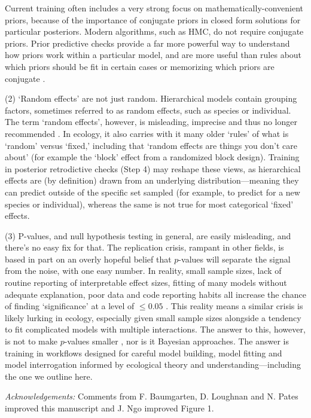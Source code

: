 \documentclass[11pt]{article}
\begin{document}
Current training often includes a very strong focus on mathematically-convenient priors, because of the importance of conjugate priors in closed form solutions for particular posteriors. Modern algorithms, such as HMC, do not require conjugate priors. Prior predictive checks provide a far more powerful way to understand how priors work within a particular model, and are more useful than rules about which priors should be fit in certain cases or memorizing which priors are conjugate \citep{betanprior}. 

(2) `Random effects' are not just random. Hierarchical models contain grouping factors, sometimes referred to as random effects, such as species or individual. The term `random effects', however, is misleading, imprecise and thus no longer recommended \citep{gelmanhill}. In ecology, it also carries with it many older `rules' of what is `random' versus `fixed,' including that `random effects are things you don't care about' (for example the `block' effect from a randomized block design). Training in posterior retrodictive checks (Step 4) may reshape these views, as hierarchical effects are (by definition) drawn from an underlying distribution---meaning they can predict outside of the specific set  sampled (for example, to predict for a new species or individual), whereas the same is not true for most categorical `fixed' effects.


(3) P-values, and null hypothesis testing in general, are easily misleading, and there’s no easy fix for that. The replication crisis, rampant in other fields, is based in part on an overly hopeful belief that $p$-values will separate the signal from the noise, with one easy number. In reality, small sample sizes, lack of routine reporting of interpretable effect sizes, fitting of many models without adequate explanation, poor data and code reporting habits all increase the chance of finding `significance' at a level of $\le0.05$ \citep{halsey2015,loken2017}. This reality means a similar crisis is likely lurking in ecology, especially given small sample sizes alongside a tendency to fit complicated models with multiple interactions. The answer to this, however, is not to make $p$-values smaller \citep{halsey2015,colquhoun2017}, nor is it Bayesian approaches. 
The answer is training in workflows designed for careful model building, model fitting and model interrogation informed by ecological theory and understanding---including the one we outline here. 

\emph{Acknowledgements:} Comments from F. Baumgarten, D. Loughnan and N. Pates improved this manuscript and J. Ngo improved Figure 1. 
\end{document}
